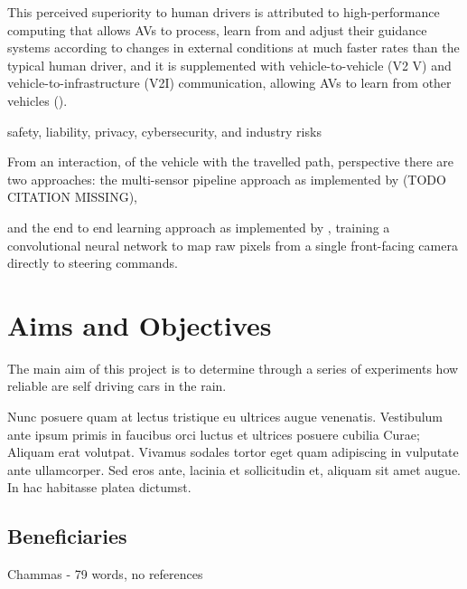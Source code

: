 This perceived superiority to human drivers is attributed to high-performance computing that allows AVs to process, learn from and adjust their guidance systems according
to changes in external conditions at much faster rates than the typical human driver, and it
is supplemented with vehicle-to-vehicle (V2 V) and vehicle-to-infrastructure (V2I) communication, allowing AVs to learn from other vehicles (\cite{west2016moving}).

safety, liability, privacy, cybersecurity, and industry risks \cite{Taeihagh_2018}

From an interaction, of the vehicle with the travelled path, perspective there are two approaches: the multi-sensor pipeline approach as implemented by (TODO CITATION MISSING), 

and the end to end learning approach as implemented by \cite{bojarski2016end}, training a convolutional neural network to map raw pixels from a single front-facing camera directly to steering commands.




\section{Aims and Objectives}


The main aim of this project is to determine through a series of experiments how reliable are self driving cars in the rain.

Nunc posuere quam at lectus tristique eu ultrices augue venenatis. Vestibulum ante ipsum primis in faucibus orci luctus et ultrices posuere cubilia Curae; Aliquam erat volutpat. Vivamus sodales tortor eget quam adipiscing in vulputate ante ullamcorper. Sed eros ante, lacinia et sollicitudin et, aliquam sit amet augue. In hac habitasse platea dictumst.

\subsection{Beneficiaries}

Chammas - 79 words, no references


